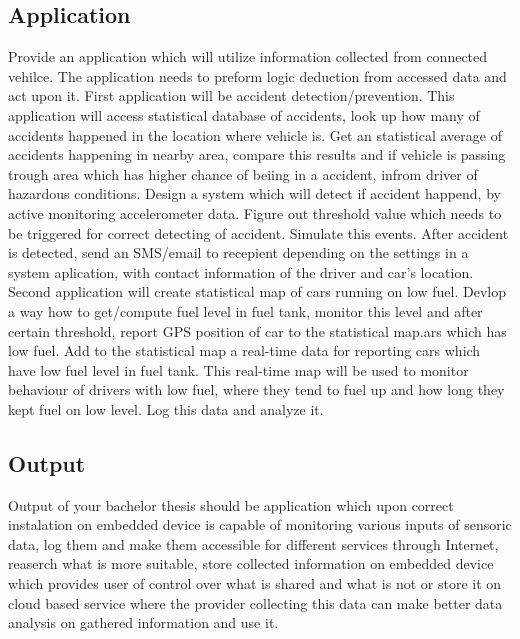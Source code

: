 \subsection{Application}
Provide an application which will utilize information collected from connected vehilce. The application needs to preform logic deduction from accessed data and act upon it. First application will  be accident detection/prevention. This application will access statistical database of accidents, look up how many of accidents happened in the location where vehicle is. Get an statistical average of accidents happening in nearby area, compare this results and if vehicle is passing trough area which has higher chance of beiing in a accident, infrom driver of hazardous conditions. Design a system which will detect if accident happend, by active monitoring accelerometer data. Figure out threshold value which needs to be triggered for correct detecting of accident. Simulate this events. After accident is detected, send an SMS/email to recepient depending on the settings in a system aplication, with contact information of the driver and car's location. Second application will create statistical map of cars running on low fuel. Devlop a way how to get/compute fuel level in fuel tank, monitor this level and after certain threshold, report GPS position of car to the statistical map.ars which has low fuel. Add to the statistical map a real-time data for reporting cars which have low fuel level in fuel tank. This real-time map will be used to monitor behaviour of drivers with low fuel, where they tend to fuel up and how long they kept fuel on low level. Log this data and analyze it.

\subsection{Output}
Output of your bachelor thesis should be application which upon correct instalation on embedded device is capable of monitoring various inputs of sensoric data, log them and make them accessible for different services through Internet, reaserch what is more suitable, store collected information on embedded device which provides user of control over what is shared and what is not or store it on cloud based service where the provider collecting this data can make better data analysis on gathered information and use it.